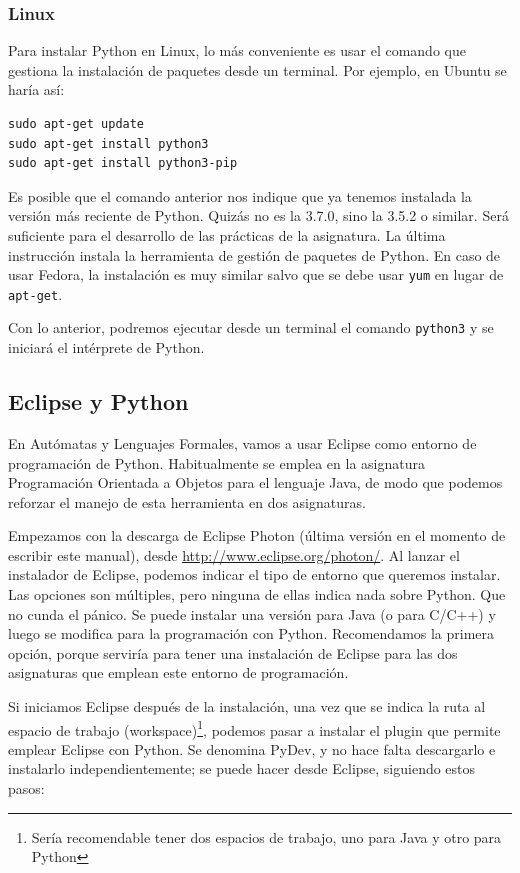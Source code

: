 \subsubsection{Linux}

Para instalar Python en Linux, lo más conveniente es usar el comando que gestiona la instalación de paquetes desde un terminal. Por ejemplo, en Ubuntu se haría así:

\begin{lstlisting}
sudo apt-get update
sudo apt-get install python3
sudo apt-get install python3-pip
\end{lstlisting}

Es posible que el comando anterior nos indique que ya tenemos instalada la versión más reciente de Python. Quizás no es la 3.7.0, sino la 3.5.2 o similar. Será suficiente para el desarrollo de las prácticas de la asignatura. La última instrucción instala la herramienta de gestión de paquetes de Python. En caso de usar Fedora, la instalación es muy similar salvo que se debe usar \texttt{yum} en lugar de \texttt{apt-get}.

Con lo anterior, podremos ejecutar desde un terminal el comando \texttt{python3} y se iniciará el intérprete de Python.

\subsection{Eclipse y Python}\label{sec:eclipsePython}

En Autómatas y Lenguajes Formales, vamos a usar Eclipse como entorno de programación de Python. Habitualmente se emplea en la asignatura Programación Orientada a Objetos para el lenguaje Java, de modo que podemos reforzar el manejo de esta herramienta en dos asignaturas. 

Empezamos con la descarga de Eclipse Photon (última versión en el momento de escribir este manual), desde \url{http://www.eclipse.org/photon/}. Al lanzar el instalador de Eclipse, podemos indicar el tipo de entorno que queremos instalar. Las opciones son múltiples, pero ninguna de ellas indica nada sobre Python. Que no cunda el pánico. Se puede instalar una versión para Java (o para C/C++) y luego se modifica para la programación con Python. Recomendamos la primera opción, porque serviría para tener una instalación de Eclipse para las dos asignaturas que emplean este entorno de programación.

Si iniciamos Eclipse después de la instalación, una vez que se indica la ruta al espacio de trabajo (workspace)\footnote{Sería recomendable tener dos espacios de trabajo, uno para Java y otro para Python}, podemos pasar a instalar el plugin que permite emplear Eclipse con Python. Se denomina PyDev, y no hace falta descargarlo e instalarlo independientemente; se puede hacer desde Eclipse, siguiendo estos pasos:

